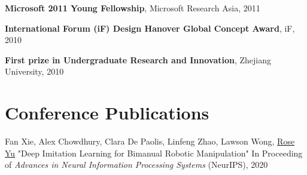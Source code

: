 \documentclass[margin,line]{res}
\begin{document}
\begin{resume}
\textbf{Microsoft 2011 Young Fellowship}, Microsoft Research Asia, 2011


\textbf{International Forum (iF) Design Hanover Global Concept Award}, iF, 2010 

\textbf{First prize in Undergraduate Research and Innovation}, Zhejiang University, 2010   





%
%
%     
%
%
%	
%	
%
%


\section{\sc Conference Publications}

\begin{enumerate}[label={[C\arabic*]}]
\item Fan Xie,  Alex  Chowdhury, Clara De Paolis, Linfeng Zhao, Lawson Wong,  \underline{Rose Yu}
"Deep Imitation Learning for Bimanual  Robotic Manipulation"
  In Proceeding of \textit{Advances in Neural Information Processing Systems} (NeurIPS), 2020
  

\end{enumerate}
\end{resume}
\end{document}
